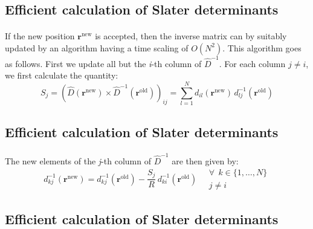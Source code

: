 \documentclass[%
twoside,                 %
final,                   %
10pt]{article}
\begin{document}
\subsection*{Efficient calculation of Slater determinants}

\paragraph{}
If the new position $\mathbf{r}^{\mathrm{new}}$ is accepted, then the
inverse matrix can by suitably updated by an algorithm having a time
scaling of $O(N^2)$.  This algorithm goes as
follows. First we update all but the \emph{i}-th column of $\hat{D}^{-1}$. For each column $j\neq i$, we first calculate the quantity:
\begin{equation}
S_j =
(\hat{D}(\mathbf{r}^{\mathrm{new}})\times
\hat{D}^{-1}(\mathbf{r}^{\mathrm{old}}))_{ij} =
\sum_{l=1}^N d_{il}(\mathbf{r}^{\mathrm{new}})\,
d^{-1}_{lj}(\mathbf{r}^{\mathrm{old}})
\label{eq:inverse_update_1}
\end{equation}


\subsection*{Efficient calculation of Slater determinants}

\paragraph{}
The new elements of the \emph{j}-th column of $\hat{D}^{-1}$ are then given
by:
\begin{equation}
d_{kj}^{-1}(\mathbf{r}^{\mathrm{new}}) =
d_{kj}^{-1}(\mathbf{r}^{\mathrm{old}}) -
\frac{S_j}{R}\,d_{ki}^{-1}(\mathbf{r}^{\mathrm{old}})\quad
\begin{array}{ll}
\forall\ \ k\in\{1,\dots,N\}\\j\neq i
\end{array}
\label{eq:inverse_update_2}
\end{equation}


\subsection*{Efficient calculation of Slater determinants}

\paragraph{}
\end{document}
